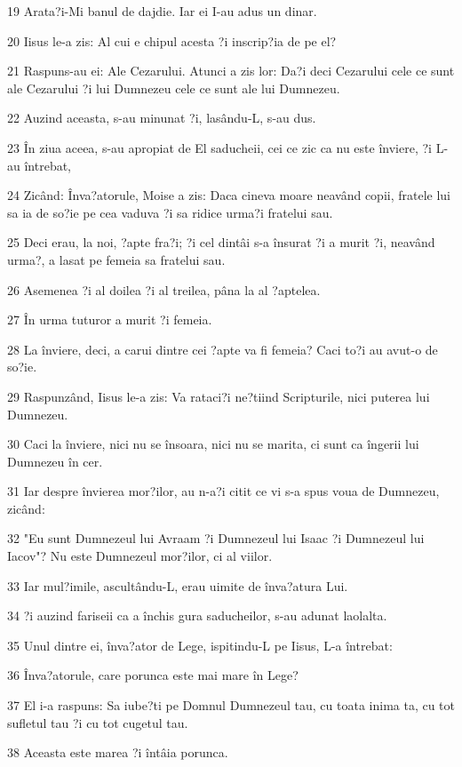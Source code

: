 \par 19 Arata?i-Mi banul de dajdie. Iar ei I-au adus un dinar.
\par 20 Iisus le-a zis: Al cui e chipul acesta ?i inscrip?ia de pe el?
\par 21 Raspuns-au ei: Ale Cezarului. Atunci a zis lor: Da?i deci Cezarului cele ce sunt ale Cezarului ?i lui Dumnezeu cele ce sunt ale lui Dumnezeu.
\par 22 Auzind aceasta, s-au minunat ?i, lasându-L, s-au dus.
\par 23 În ziua aceea, s-au apropiat de El saducheii, cei ce zic ca nu este înviere, ?i L-au întrebat,
\par 24 Zicând: Înva?atorule, Moise a zis: Daca cineva moare neavând copii, fratele lui sa ia de so?ie pe cea vaduva ?i sa ridice urma?i fratelui sau.
\par 25 Deci erau, la noi, ?apte fra?i; ?i cel dintâi s-a însurat ?i a murit ?i, neavând urma?, a lasat pe femeia sa fratelui sau.
\par 26 Asemenea ?i al doilea ?i al treilea, pâna la al ?aptelea.
\par 27 În urma tuturor a murit ?i femeia.
\par 28 La înviere, deci, a carui dintre cei ?apte va fi femeia? Caci to?i au avut-o de so?ie.
\par 29 Raspunzând, Iisus le-a zis: Va rataci?i ne?tiind Scripturile, nici puterea lui Dumnezeu.
\par 30 Caci la înviere, nici nu se însoara, nici nu se marita, ci sunt ca îngerii lui Dumnezeu în cer.
\par 31 Iar despre învierea mor?ilor, au n-a?i citit ce vi s-a spus voua de Dumnezeu, zicând:
\par 32 "Eu sunt Dumnezeul lui Avraam ?i Dumnezeul lui Isaac ?i Dumnezeul lui Iacov"? Nu este Dumnezeul mor?ilor, ci al viilor.
\par 33 Iar mul?imile, ascultându-L, erau uimite de înva?atura Lui.
\par 34 ?i auzind fariseii ca a închis gura saducheilor, s-au adunat laolalta.
\par 35 Unul dintre ei, înva?ator de Lege, ispitindu-L pe Iisus, L-a întrebat:
\par 36 Înva?atorule, care porunca este mai mare în Lege?
\par 37 El i-a raspuns: Sa iube?ti pe Domnul Dumnezeul tau, cu toata inima ta, cu tot sufletul tau ?i cu tot cugetul tau.
\par 38 Aceasta este marea ?i întâia porunca.
